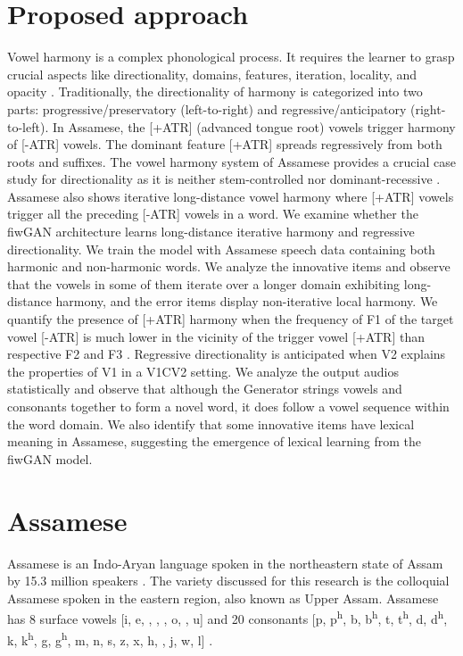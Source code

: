 \documentclass{Interspeech2024}
\begin{document}
\section{Proposed approach}
 Vowel harmony is a complex phonological process. It requires the learner to grasp crucial aspects like directionality, domains, features, iteration, locality, and opacity \cite{archangeli_harmony_2007}. Traditionally, the directionality of harmony is categorized into two parts: progressive/preservatory (left-to-right) and regressive/anticipatory (right-to-left). In Assamese, the [+ATR] (advanced tongue root) vowels trigger harmony of [-ATR] vowels. The dominant feature [+ATR] spreads regressively from both roots and suffixes. The vowel harmony system of Assamese provides a crucial case study for directionality as it is neither stem-controlled nor dominant-recessive \cite{mahanta_directionality_2008}. Assamese also shows iterative long-distance vowel harmony where [+ATR] vowels trigger all the preceding [-ATR] vowels in a word. We examine whether the fiwGAN architecture learns long-distance iterative harmony and regressive directionality. We train the model with Assamese speech data containing both harmonic and non-harmonic words. We analyze the innovative items and observe that the vowels in some of them iterate over a longer domain exhibiting long-distance harmony, and the error items display non-iterative local harmony. We quantify the presence of [+ATR] harmony when the frequency of F1 of the target vowel [-ATR] is much lower in the vicinity of the trigger vowel [+ATR] than respective F2 and F3 \cite{mintz_infants_2018,olejarczuk_acoustic_2019}. Regressive directionality is anticipated when V2 explains the properties of V1 in a V1CV2 setting. We analyze the output audios statistically and observe that although the Generator strings vowels and consonants together to form a novel word, it does follow a vowel sequence within the word domain. We also identify that some innovative items have lexical meaning in Assamese, suggesting the emergence of lexical learning from the fiwGAN model.
 
\section{Assamese}
Assamese is an Indo-Aryan language spoken in the northeastern state of Assam by 15.3 million speakers \cite{census_2011}. The variety discussed for this research is the colloquial Assamese spoken in the eastern region, also known as Upper Assam. Assamese has 8 surface vowels [i, e, \textepsilon , \textscripta, \textopeno, o, \textupsilon, u] and 20 consonants [p, p\textsuperscript{h}, b, b\textsuperscript{h}, t, t\textsuperscript{h}, d, d\textsuperscript{h}, k, k\textsuperscript{h}, g, g\textsuperscript{h}, m, n, \textipa{\ng} s, z, x, h, \textturnr, j, w, l] \cite{mahanta_directionality_2008}.
\end{document}
